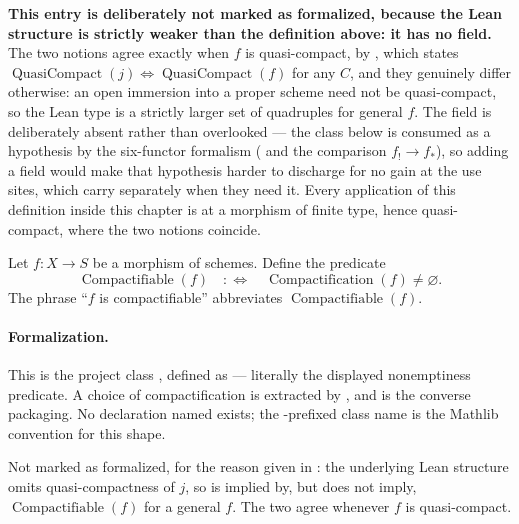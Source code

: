 \begin{definition}[Compactification]
  \textbf{This entry is deliberately not marked as formalized, because the Lean structure is
  strictly weaker than the definition above: it has no \texttt{}
  field.}  The two notions agree exactly when $f$ is quasi-compact, by
  \texttt{}, which states
  $\operatorname{QuasiCompact}(j)\iff\operatorname{QuasiCompact}(f)$ for any $C$,
  and they genuinely differ otherwise: an open immersion into a proper scheme need not be
  quasi-compact, so the Lean type is a strictly larger set of quadruples for general $f$.
  The field is deliberately absent rather than overlooked --- the class
  \texttt{} below is consumed as a hypothesis by the
  six-functor formalism (\texttt{} and the comparison
  $f_!\to f_*$), so adding a field would make that hypothesis harder to discharge for no gain
  at the use sites, which carry \texttt{} separately when they need
  it.  Every application of this definition inside this chapter is at a morphism of finite
  type, hence quasi-compact, where the two notions coincide.
\end{definition}

\begin{definition}[Compactifiability]
  \label{def:nagata-compactifiable}

  Let \(f\colon X\to S\) be a morphism of schemes.  Define the predicate
  \[
    \operatorname{Compactifiable}(f)
      \quad:\Longleftrightarrow\quad
    \operatorname{Compactification}(f)\neq\varnothing.
  \]
  The phrase ``$f$ is compactifiable'' abbreviates
  $\operatorname{Compactifiable}(f)$.

  \paragraph{Formalization.}
  This is the project class
  \texttt{}, defined as
  \texttt{} --- literally the displayed
  nonemptiness predicate.  A choice of compactification is extracted by
  \texttt{}, and
  \texttt{} is the converse packaging.  No
  declaration named \texttt{} exists; the
  \texttt{}-prefixed class name is the Mathlib convention for this shape.

  Not marked as formalized, for the reason given in
  : the underlying Lean structure omits quasi-compactness
  of $j$, so \texttt{} is implied by, but does not imply,
  $\operatorname{Compactifiable}(f)$ for a general $f$.  The two agree whenever $f$ is
  quasi-compact.
\end{definition}

